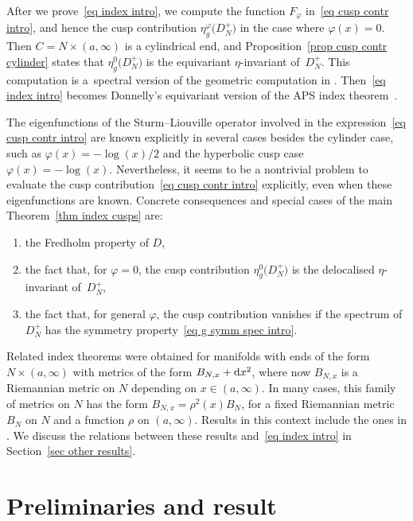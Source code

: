 \documentclass[10pt,a4paper]{amsart}
\numberwithin{equation}{section}
\begin{document}
After we prove~\eqref{eq index intro}, we compute the function $F_{\varphi}$ in~\eqref{eq cusp contr intro}, and hence the cusp contribution $\eta_g^{\varphi}\big(D_N^+\big)$ in the case where $\varphi(x) = 0$. Then $C = N \times (a, \infty)$ is a cylindrical end, and Proposition~\ref{prop cusp contr cylinder} states that $\eta_g^{0}\big(D_N^+\big)$ is the equivariant $\eta$-invariant \cite{Donnelly} of~$D_N^+$. This computation is a~spectral version of the geometric computation in \cite[Section~5]{HW21a}. Then~\eqref{eq index intro} becomes Donnelly's equivariant version of the APS index theorem~\cite{Donnelly}.

The eigenfunctions of the Sturm--Liouville operator involved in the expression~\eqref{eq cusp contr intro} are known explicitly in several cases besides the cylinder case, such as $\varphi(x) = -\log(x)/2$ and the hyperbolic cusp case $\varphi(x) = -\log(x)$. Nevertheless,
 it seems to be a nontrivial problem to evaluate the cusp contribution~\eqref{eq cusp contr intro} explicitly, even when these eigenfunctions are known. Concrete consequences and special cases of the main Theorem~\ref{thm index cusps} are:
\begin{enumerate}\itemsep=0pt\samepage
\item[(1)] the Fredholm property of $D$,
\item[(2)] the fact that, for $\varphi = 0$, the cusp contribution $\eta_g^0\big(D_N^+\big)$ is the delocalised $\eta$-invariant of~$D_N^+$,
\item[(3)] the fact that, for general $\varphi$, the cusp contribution vanishes if the spectrum of $D_N^+$ has the symmetry property~\eqref{eq g symm spec intro}.
\end{enumerate}

Related index theorems were obtained for manifolds with ends of the form $N \times (a, \infty)$ with metrics of the form $B_{N, x} + {\rm d}x^2$, where now $B_{N, x}$ is a Riemannian metric on $N$ depending on $x\in (a, \infty)$. In many cases, this family of metrics on $N$ has the form $B_{N, x} = \rho^2(x)B_N$, for a fixed Riemannian metric $B_N$ on $N$ and a function $\rho$ on $(a, \infty)$. Results in this context include the ones in
 \cite{Baier02, BB03, BBC12, Stern84, Vaillant01}. We discuss the relations between these results and~\eqref{eq index intro} in Section~\ref{sec other results}.



\section{Preliminaries and result} \label{sec results}
\end{document}
